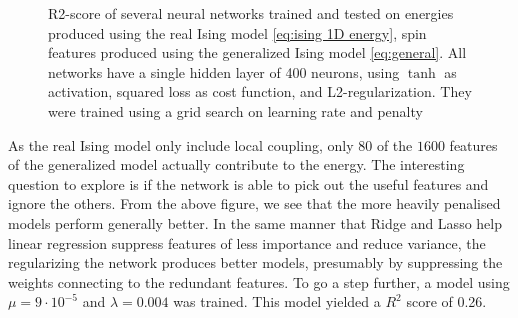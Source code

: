 \begin{figure}[H]
\centering
{}
\qquad
{}
\caption{R2-score of several neural networks trained and tested on energies produced using the real Ising model \autoref{eq:ising 1D energy}, spin features produced using the generalized Ising model \autoref{eq:general}. All networks have a single hidden layer of 400 neurons, using $\tanh$ as activation, squared loss as cost function, and L2-regularization. They were trained using a grid search on learning rate and penalty}
\label{fig:NN_reg}
\end{figure}

As the real Ising model only include local coupling, only $80$ of the $1600$ features of the generalized model actually contribute to the energy. The interesting question to explore is if the network is able to pick out the useful features and ignore the others. From the above figure, we see that the more heavily penalised models perform generally better. In the same manner that Ridge and Lasso help linear regression suppress features of less importance and reduce variance, the regularizing the network produces better models, presumably by suppressing the weights connecting to the redundant features. To go a step further, a model using $\mu = 9 \cdot 10^{-5}$ and $\lambda = 0.004$ was trained. This model yielded a $R^2$ score of 0.26. 

